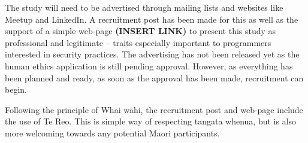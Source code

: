 \par The study will need to be advertised through mailing lists and websites like Meetup and LinkedIn. A recruitment post has been made for this as well as the support of a simple web-page \textbf{(INSERT LINK) }to present this study as professional and legitimate – traits especially important to programmers interested in security practices. The advertising has not been released yet as the human ethics application is still pending approval. However, as everything has been planned and ready, as soon as the approval has been made, recruitment can begin. 
\newline
\par Following the principle of Whai wāhi, the recruitment post and web-page include the use of Te Reo. This is simple way of respecting tangata whenua, but is also more welcoming towards any potential Maori participants.







